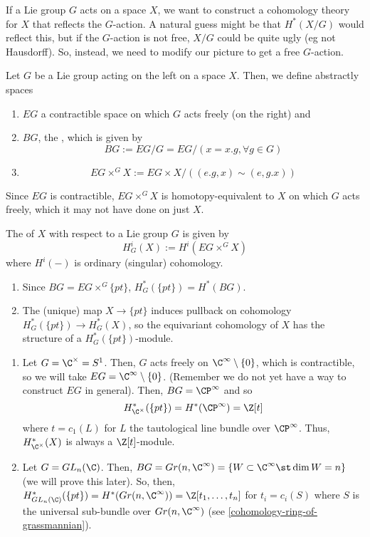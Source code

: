 \documentclass[11pt,leqno,oneside]{amsbook}
\numberwithin{thm}{section}
\newcommand{\Gr}{Gr}
\begin{document}
If a Lie group \(G\) acts on a space \(X\), we want to construct a
cohomology theory for \(X\) that reflects the \(G\)-action. A natural
guess might be that \(H^*(X/G)\) would reflect this, but if the
\(G\)-action is not free, \(X/G\) could be quite ugly (eg not
Hausdorff). So, instead, we need to modify our picture to get a free
\(G\)-action. 
\begin{defn}
  Let \(G\) be a Lie group acting on the left on a space \(X\). Then,
  we define abstractly spaces
  \begin{enumerate}
  \item \(EG\) a contractible space on which \(G\) acts freely (on the
    right) and
  \item \(BG\), the , which is given by \[
      BG := EG/G = EG/(x = x.g, \forall g \in G)
    \]
  \item \[
      EG \times^G X := EG \times X /((e.g, x) \sim (e,g.x))
    \]
  \end{enumerate}
\end{defn}
Since \(EG\) is contractible, \(EG \times^G X\) is homotopy-equivalent
to \(X\) on which \(G\) acts freely, which it may not have done on
just \(X\).
\begin{defn}
  The  of \(X\) with respect to a Lie group
  \(G\) is given by \[
    H_G^i(X) := H^i(EG \times^G X)
  \]
  where \(H^i(-)\) is ordinary (singular) cohomology. 
\end{defn}
\begin{prop}
  \begin{enumerate}
  \item Since \(BG = EG \times^G \{pt\}\),
    \(H^*_G(\{pt\}) = H^*(BG)\).
  \item The (unique) map \(X \to \{pt\}\) induces pullback on
    cohomology \(H_G^*(\{pt\}) \to H_G^*(X)\), so the equivariant
    cohomology of \(X\) has the structure of a
    \(H_G^*(\{pt\})\)-module. 
  \end{enumerate}
\end{prop}
\begin{example}
  \begin{enumerate}
  \item Let \(G = \C^\times = S^1\). Then, \(G\) acts freely on
    \(\C^\infty \setminus \{0\}\), which is contractible, so we will
    take \(EG = \C^\infty \setminus \{0\}\). (Remember we do not yet
    have a way to construct \(EG\) in general). Then,
    \(BG = \CP^\infty\) and so
    \[ H_{\C^\times}^*(\{pt\}) = H^*(\CP^\infty) = \Z[t]
    \]
    where \(t = c_1(L)\) for \(L\) the tautological line bundle over
    \(\CP^\infty\). Thus, \(H_{\C^\times}^*(X)\) is always a
    \(\Z[t]\)-module.
  \item Let \(G = GL_n(\C)\). Then, \(BG = \Gr(n,\C^\infty) = \{W
    \subset \C^\infty \st \dim W = n\}\) (we will prove this
    later). So, then, \(H_{GL_n(\C)}^*(\{pt\}) = H^*(\Gr(n,\C^\infty))
    = \Z[t_1, \ldots, t_n]\) for \(t_i = c_i(S)\) where \(S\) is the
    universal sub-bundle over \(\Gr(n,\C^\infty)\) (see
    \ref{cohomology-ring-of-grassmannian}). 
  \end{enumerate}
\end{example}
\end{document}
